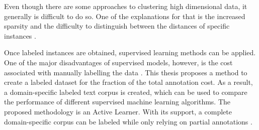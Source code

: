 \documentclass[11pt, a4paper]{article}
\begin{document}
Even though there are some approaches to clustering high dimensional data, it generally is difficult to do so. 
One of the explanations for that is the increased sparsity and the difficulty to distinguish between the distances 
of specific instances \citep{tomasev2014roleofhubness}.

Once labeled instances are obtained, supervised learning methods can be applied.
One of the major disadvantages of supervised models, however, is the cost associated with manually labelling 
the data \citep{miller2020activelearningapproaches}.
This thesis proposes a method to create a labeled dataset for the fraction of the total annotation cost. 
As a result, a domain-specific labeled text corpus is created, which can be used to compare the performance of different supervised machine learning algorithms.
The proposed methodology is an Active Learner. With its support, a complete domain-specific corpus can be labeled while only relying on partial annotations \citep{park2015EfficientExtraction}. 
\end{document}
